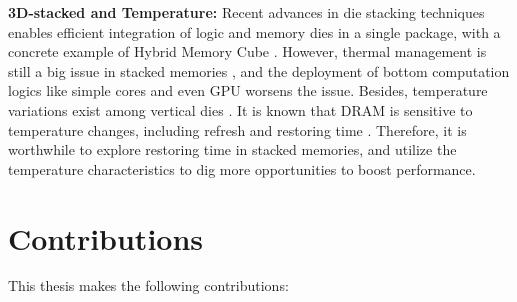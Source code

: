 \textbf{3D-stacked and Temperature:}
Recent advances in die stacking techniques enables efficient integration of logic and memory dies in a single package, with a concrete example of Hybrid Memory Cube \cite{HMC:spec2}.
However, thermal management is still a big issue in stacked memories \cite{DAC06:3dmodel, WONDP14:thermal}, and the deployment of bottom computation logics like simple cores \cite{ISCA15:pim} and even GPU \cite{HPDC14:pim_gpu} worsens the issue. Besides, temperature variations exist among vertical dies \cite{ICCD13:temp}. It is known that DRAM is sensitive to temperature changes, including refresh \cite{HPCA15:al-dram, ISCA13:ddr4} and restoring time \cite{PATENT14:twr, MEM14:twr}.
Therefore, it is worthwhile to explore restoring time in stacked memories, and utilize the temperature characteristics to dig more opportunities to boost performance. 


\section{Contributions}
This thesis makes the following contributions:

